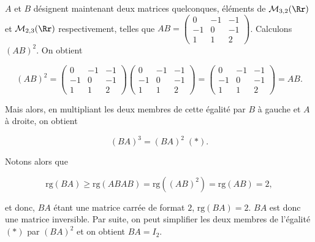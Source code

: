{{$A$ et $B$ désignent maintenant deux matrices quelconques, éléments de $\mathcal{M}_{3,2}(\Rr)$ et $\mathcal{M}_{2,3}(\Rr)$ respectivement, telles que $AB=\left(
\begin{array}{ccc}
0&-1&-1\\
-1&0&-1\\
1&1&2
\end{array}
\right)$. Calculons $(AB)^2$. On obtient

$$(AB)^2=\left(
\begin{array}{ccc}
0&-1&-1\\
-1&0&-1\\
1&1&2
\end{array}
\right)\left(
\begin{array}{ccc}
0&-1&-1\\
-1&0&-1\\
1&1&2
\end{array}
\right)=\left(
\begin{array}{ccc}
0&-1&-1\\
-1&0&-1\\
1&1&2
\end{array}
\right)=AB.$$

Mais alors, en multipliant les deux membres de cette égalité par $B$ à gauche et $A$ à droite, on obtient

$$(BA)^3=(BA)^2\;(*).$$

Notons alors que 

$$\mbox{rg}(BA)\geq\mbox{rg}(ABAB)=\mbox{rg}((AB)^2)=\mbox{rg}(AB)=2,$$

et donc, $BA$ étant une matrice carrée de format $2$, $\mbox{rg}(BA)=2$. $BA$ est donc une matrice inversible. Par suite, on peut simplifier les deux membres de l'égalité $(*)$ par $(BA)^2$ et on obtient $BA=I_2$.
}
}
